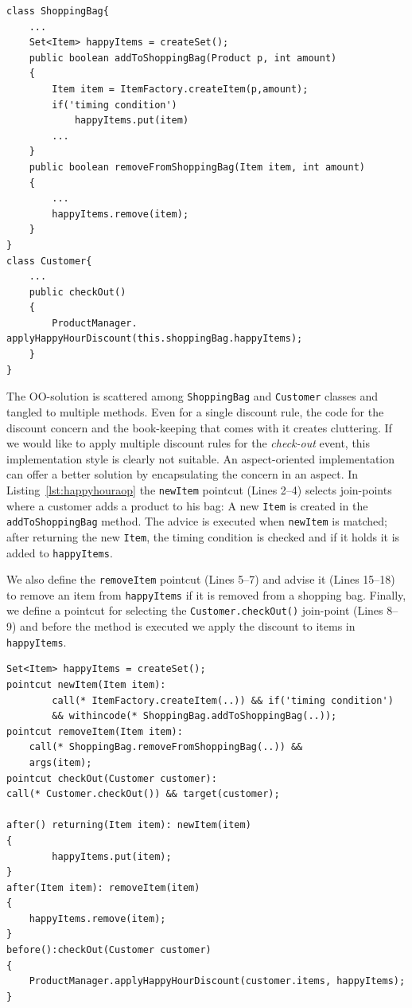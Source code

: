 \begin{lstlisting}[float, caption={A Java implementation of happy-hour discount rule}, label={lst:happyhour}]
class ShoppingBag{
	...
	Set<Item> happyItems = createSet();
	public boolean addToShoppingBag(Product p, int amount)
	{
		Item item = ItemFactory.createItem(p,amount);
		if('timing condition')
			happyItems.put(item)
		...
	}
	public boolean removeFromShoppingBag(Item item, int amount)
	{
		...
		happyItems.remove(item);
	}
}
class Customer{
	...
	public checkOut()
	{
		ProductManager. applyHappyHourDiscount(this.shoppingBag.happyItems);
	}
}
\end{lstlisting}

The OO-solution is scattered among \texttt{ShoppingBag} and \texttt{Customer} classes and tangled to multiple methods. Even for a single discount rule, the code for the discount concern and the book-keeping that comes with it creates cluttering. If we would like to apply multiple discount rules for the \emph{check-out} event, this implementation style is clearly not suitable.
An aspect-oriented implementation can offer a better solution by encapsulating the concern in an aspect. In Listing~\ref{lst:happyhouraop} the \texttt{newItem} pointcut (Lines 2--4) selects join-points where a customer adds a product to his bag: A new \texttt{Item} is created in the \texttt{addToShoppingBag} method. The advice is executed when \texttt{newItem} is matched; after returning the new \texttt{Item}, the timing condition is checked and if it holds it is added to \texttt{happyItems}. 

We also define the \texttt{removeItem} pointcut (Lines 5--7) and advise it (Lines 15--18) to remove an item from \texttt{happyItems} if it is removed from a shopping bag.
Finally, we define a pointcut for selecting the \texttt{Customer.checkOut()} join-point (Lines 8--9) and before the method is executed we apply the discount to items in \texttt{happyItems}.

\begin{lstlisting}[float, caption={An Aspectj implementation of happy-hour discount rule}, label={lst:happyhouraop}]
Set<Item> happyItems = createSet();
pointcut newItem(Item item): 
		call(* ItemFactory.createItem(..)) && if('timing condition') 
		&& withincode(* ShoppingBag.addToShoppingBag(..));
pointcut removeItem(Item item): 
	call(* ShoppingBag.removeFromShoppingBag(..)) && 
	args(item);
pointcut checkOut(Customer customer): 
call(* Customer.checkOut()) && target(customer);

after() returning(Item item): newItem(item)
{
		happyItems.put(item);
}
after(Item item): removeItem(item)
{
	happyItems.remove(item);
}
before():checkOut(Customer customer)
{
	ProductManager.applyHappyHourDiscount(customer.items, happyItems);
}
\end{lstlisting}

